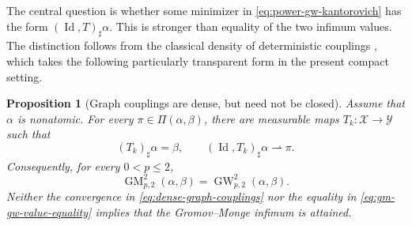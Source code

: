 \documentclass[11pt,a4paper]{article}
\newtheorem{proposition}[theorem]{Proposition}
\theoremstyle{definition}
\theoremstyle{remark}
\newcommand{\Piopt}{\Pi}
\newcommand{\Id}{\operatorname{Id}}
\newcommand{\GW}{\operatorname{GW}}
\newcommand{\GM}{\operatorname{GM}}
\begin{document}
The central question is whether some minimizer in
\eqref{eq:power-gw-kantorovich} has the form \((\Id,T)_\sharp\alpha\).  This
is stronger than equality of the two infimum values.  The distinction follows
from the classical density of deterministic couplings
\citep{Pratelli2007,MemoliNeedham2024}, which takes the following particularly
transparent form in the present compact setting.

\begin{proposition}[Graph couplings are dense, but need not be closed]
\label{prop:graph-couplings-dense}
Assume that \(\alpha\) is nonatomic.  For every
\(\pi\in\Piopt(\alpha,\beta)\), there are measurable maps
\(T_k:\mathcal X\to\mathcal Y\) such that
\begin{equation}
  (T_k)_\sharp\alpha=\beta,
  \qquad
  (\Id,T_k)_\sharp\alpha\rightharpoonup\pi.
  \label{eq:dense-graph-couplings}
\end{equation}
Consequently, for every \(0<p\leq2\),
\begin{equation}
  \GM_{p,2}^2(\alpha,\beta)=\GW_{p,2}^2(\alpha,\beta).
  \label{eq:gm-gw-value-equality}
\end{equation}
Neither the convergence in \eqref{eq:dense-graph-couplings} nor the equality
in \eqref{eq:gm-gw-value-equality} implies that the Gromov--Monge infimum is
attained.
\end{proposition}
\end{document}
